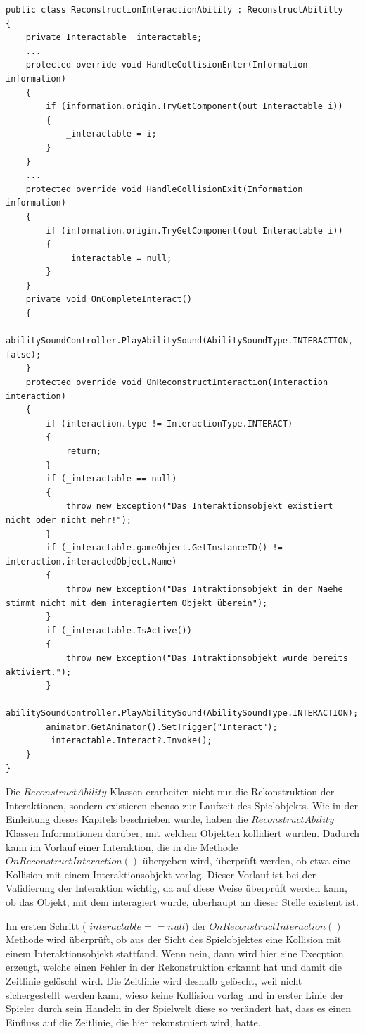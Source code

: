 \begin{lstlisting}[caption={Ausschnitt aus ReconstructionInteractionAbility.cs Klasse}, label={lst:reconstruction-interaction-ability}]
public class ReconstructionInteractionAbility : ReconstructAbilitty
{
    private Interactable _interactable;
    ...
    protected override void HandleCollisionEnter(Information information)
    {
        if (information.origin.TryGetComponent(out Interactable i))
        {
            _interactable = i;
        }
    }
    ...
    protected override void HandleCollisionExit(Information information)
    {
        if (information.origin.TryGetComponent(out Interactable i))
        {
            _interactable = null;
        }
    }
    private void OnCompleteInteract()
    {
        abilitySoundController.PlayAbilitySound(AbilitySoundType.INTERACTION, false);
    }
    protected override void OnReconstructInteraction(Interaction interaction)
    {
        if (interaction.type != InteractionType.INTERACT)
        {
            return;
        }
        if (_interactable == null)
        {
            throw new Exception("Das Interaktionsobjekt existiert nicht oder nicht mehr!");
        }
        if (_interactable.gameObject.GetInstanceID() != interaction.interactedObject.Name)
        {
            throw new Exception("Das Intraktionsobjekt in der Naehe stimmt nicht mit dem interagiertem Objekt überein");
        }
        if (_interactable.IsActive())
        {
            throw new Exception("Das Intraktionsobjekt wurde bereits aktiviert.");
        }
        abilitySoundController.PlayAbilitySound(AbilitySoundType.INTERACTION);
        animator.GetAnimator().SetTrigger("Interact");
        _interactable.Interact?.Invoke();
    }
}
\end{lstlisting}

Die $ReconstructAbility$ Klassen erarbeiten nicht nur die Rekonstruktion der Interaktionen, sondern existieren ebenso zur Laufzeit des Spielobjekts. Wie in der Einleitung dieses Kapitels beschrieben wurde, haben die $ReconstructAbility$ Klassen Informationen darüber, mit welchen Objekten kollidiert wurden. Dadurch kann im Vorlauf einer Interaktion, die in die Methode $OnReconstructInteraction()$ übergeben wird, überprüft werden, ob etwa eine Kollision mit einem Interaktionsobjekt vorlag. Dieser Vorlauf ist bei der Validierung der Interaktion wichtig, da auf diese Weise überprüft werden kann, ob das Objekt, mit dem interagiert wurde, überhaupt an dieser Stelle existent ist. 

Im ersten Schritt ($\_interactable == null$) der $OnReconstructInteraction()$ Methode wird überprüft, ob aus der Sicht des Spielobjektes eine Kollision mit einem Interaktionsobjekt stattfand. Wenn nein, dann wird hier eine Execption erzeugt, welche einen Fehler in der Rekonstruktion erkannt hat und damit die Zeitlinie gelöscht wird. Die Zeitlinie wird deshalb gelöscht, weil nicht sichergestellt werden kann, wieso keine Kollision vorlag und in erster Linie der Spieler durch sein Handeln in der Spielwelt diese so verändert hat, dass es einen Einfluss auf die Zeitlinie, die hier rekonstruiert wird, hatte.

